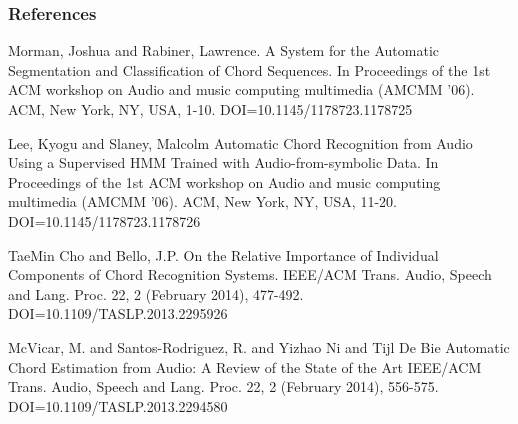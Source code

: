 \documentclass{beamer}
\begin{document}
\begin{frame}[allowframebreaks] 
	\frametitle{References} 
	
	\begin{thebibliography}{lskdjf}

Morman, Joshua and Rabiner, Lawrence.
\newblock A System for the Automatic Segmentation and Classification of Chord Sequences.
\newblock In Proceedings of the 1st ACM workshop on Audio and music computing multimedia (AMCMM '06). ACM, New York, NY, USA, 1-10. DOI=10.1145/1178723.1178725

Lee, Kyogu and Slaney, Malcolm
\newblock Automatic Chord Recognition from Audio Using a Supervised HMM Trained with Audio-from-symbolic Data.
\newblock In Proceedings of the 1st ACM workshop on Audio and music computing multimedia (AMCMM '06). ACM, New York, NY, USA, 11-20. DOI=10.1145/1178723.1178726 

TaeMin Cho and Bello, J.P.
\newblock On the Relative Importance of Individual Components of Chord Recognition Systems.
\newblock IEEE/ACM Trans. Audio, Speech and Lang. Proc. 22, 2 (February 2014), 477-492. DOI=10.1109/TASLP.2013.2295926 

McVicar, M. and Santos-Rodriguez, R. and Yizhao Ni and Tijl De Bie
\newblock Automatic Chord Estimation from Audio: A Review of the State of the Art
\newblock IEEE/ACM Trans. Audio, Speech and Lang. Proc. 22, 2 (February 2014), 556-575. DOI=10.1109/TASLP.2013.2294580 
  
  	\end{thebibliography}

\end{frame} 
\end{document}
